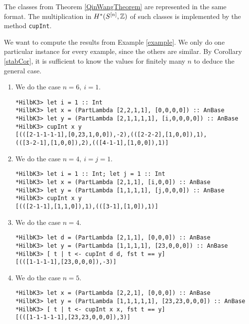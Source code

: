 The classes from Theorem \ref{QinWangTheorem} are represented in the same format. The multiplication in $H^*(S^{[n]},\mathbb{Z})$ of such classes is implemented by the method \verb|cupInt|.
\begin{example}\label{exampleSource} We want to compute the results from Example \ref{example}. We only do one particular instance for every example, since the others are similar. By Corollary \ref{stabCor}, it is sufficient to know the values for finitely many $n$ to deduce the general case.
\begin{enumerate}
\item We do the case $n=6,\ i=1$. 
\begin{Verbatim}[fontsize=\small]
*HilbK3> let i = 1 :: Int
*HilbK3> let x = (PartLambda [2,2,1,1], [0,0,0,0]) :: AnBase
*HilbK3> let y = (PartLambda [2,1,1,1,1], [i,0,0,0,0]) :: AnBase
*HilbK3> cupInt x y
[(([2-1-1-1-1],[0,23,1,0,0]),-2),(([2-2-2],[1,0,0]),1),
(([3-2-1],[1,0,0]),2),(([4-1-1],[1,0,0]),1)]
\end{Verbatim}
\item We do the case $n=4,\ i=j=1$. 
\begin{Verbatim}[fontsize=\small]
*HilbK3> let i = 1 :: Int; let j = 1 :: Int
*HilbK3> let x = (PartLambda [2,1,1], [i,0,0]) :: AnBase
*HilbK3> let y = (PartLambda [1,1,1,1], [j,0,0,0]) :: AnBase
*HilbK3> cupInt x y
[(([2-1-1],[1,1,0]),1),(([3-1],[1,0]),1)]
\end{Verbatim}
\item We do the case $n=4$. 
\begin{Verbatim}[fontsize=\small]
*HilbK3> let d = (PartLambda [2,1,1], [0,0,0]) :: AnBase
*HilbK3> let y = (PartLambda [1,1,1,1], [23,0,0,0]) :: AnBase
*HilbK3> [ t | t <- cupInt d d, fst t == y]
[(([1-1-1-1],[23,0,0,0]),-3)]
\end{Verbatim}
\item We do the case $n=5$. 
\begin{Verbatim}[fontsize=\small]
*HilbK3> let x = (PartLambda [2,2,1], [0,0,0]) :: AnBase
*HilbK3> let y = (PartLambda [1,1,1,1,1], [23,23,0,0,0]) :: AnBase
*HilbK3> [ t | t <- cupInt x x, fst t == y]
[(([1-1-1-1-1],[23,23,0,0,0]),3)]
\end{Verbatim}
\end{enumerate}
\end{example}

